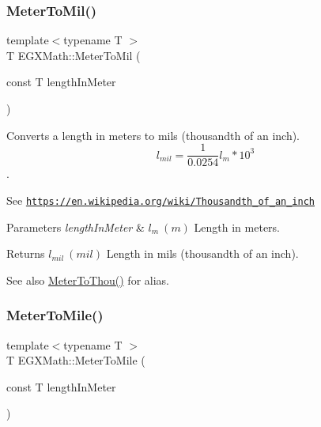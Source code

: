 \subsubsection{\texorpdfstring{Meter\+To\+Mil()}{MeterToMil()}}
{\footnotesize\ttfamily template$<$typename T $>$ \\
T E\+G\+X\+Math\+::\+Meter\+To\+Mil (\begin{DoxyParamCaption}\item[{const T}]{length\+In\+Meter }\end{DoxyParamCaption})}



Converts a length in meters to mils (thousandth of an inch). \[ l_{mil}= \frac{1}{0.0254} l_{m} * 10^{3} \]. 

See \href{https://en.wikipedia.org/wiki/Thousandth_of_an_inch}{\tt https\+://en.\+wikipedia.\+org/wiki/\+Thousandth\+\_\+of\+\_\+an\+\_\+inch} 
\begin{DoxyParams}{Parameters}
{\em length\+In\+Meter} & $ l_{m}\ (m)$ Length in meters. \\
\hline
\end{DoxyParams}
\begin{DoxyReturn}{Returns}
$ l_{mil}\ (mil)$ Length in mils (thousandth of an inch). 
\end{DoxyReturn}
\begin{DoxySeeAlso}{See also}
\mbox{\hyperlink{group___e_g_x_math-_conversions-_length_conversions-_meter-_imperial_gaebe39a6b8485aae53724390225f27a66}{Meter\+To\+Thou()}} for alias. 
\end{DoxySeeAlso}
\mbox{\label{group___e_g_x_math-_conversions-_length_conversions-_meter-_imperial_gad99b2a17c589bee13f354975b326fe74}} 
\subsubsection{\texorpdfstring{Meter\+To\+Mile()}{MeterToMile()}}
{\footnotesize\ttfamily template$<$typename T $>$ \\
T E\+G\+X\+Math\+::\+Meter\+To\+Mile (\begin{DoxyParamCaption}\item[{const T}]{length\+In\+Meter }\end{DoxyParamCaption})}



